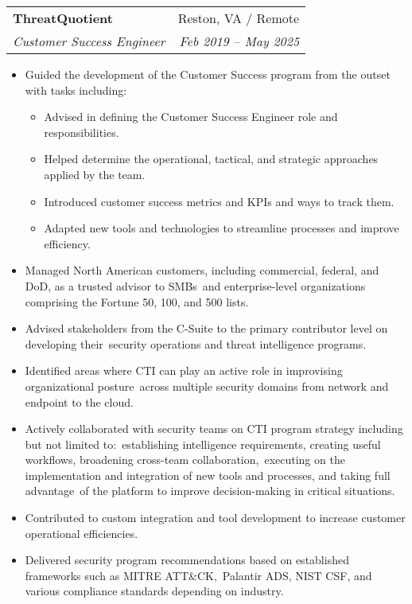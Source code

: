 \documentclass[letterpaper,11pt]{article}
\makeatletter
\newcommand{\resumeSubheading}[4]{
  \vspace{-1pt}\item
    \begin{tabular*}{0.97\textwidth}[t]{l@{\extracolsep{\fill}}r}
      \textbf{#1} & #2 \\
      \textit{\small#3} & \textit{\small #4} \\
    \end{tabular*}\vspace{-5pt}
}
\newcommand{\resumeItemListStart}{\begin{itemize}[nosep]}
\newcommand{\resumeItemListEnd}{\end{itemize}\vspace{-5pt}}
\makeatother
\begin{document}
\resumeSubheading
{ThreatQuotient}{Reston, VA / Remote}
{Customer Success Engineer}{Feb 2019 -- May 2025}
\resumeItemListStart
\item Guided the development of the Customer Success program from the outset with tasks including:
\begin{itemize}[nosep]
  \item Advised in defining the Customer Success Engineer role and responsibilities.
  \item Helped determine the operational, tactical, and strategic approaches applied by the team.
  \item Introduced customer success metrics and KPIs and ways to track them.
  \item Adapted new tools and technologies to streamline processes and improve efficiency.
\end{itemize}
\item Managed North American customers, including commercial, federal, and DoD, as a trusted advisor to SMBs\
and enterprise-level organizations comprising the Fortune 50, 100, and 500 lists.
\item Advised stakeholders from the C-Suite to the primary contributor level on developing their\
security operations and threat intelligence programs.
\item Identified areas where CTI can play an active role in improvising organizational posture\
across multiple security domains from network and endpoint to the cloud.
\break
\item Actively collaborated with security teams on CTI program strategy including but not limited to:\
establishing intelligence requirements, creating useful workflows, broadening cross-team collaboration,\
executing on the implementation and integration of new tools and processes, and taking full advantage\
of the platform to improve decision-making in critical situations.
\item Contributed to custom integration and tool development to increase customer operational efficiencies.
\item Delivered security program recommendations based on established frameworks such as {MITRE ATT\&CK},\
Palantir ADS, NIST CSF, and various compliance standards depending on industry.
\resumeItemListEnd
\end{document}
